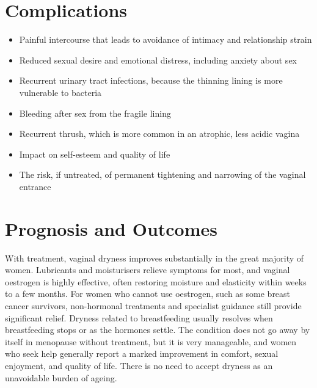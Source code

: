\section*{Complications}
\begin{itemize}
    \item Painful intercourse that leads to avoidance of intimacy and relationship strain
    \item Reduced sexual desire and emotional distress, including anxiety about sex
    \item Recurrent urinary tract infections, because the thinning lining is more vulnerable to bacteria
    \item Bleeding after sex from the fragile lining
    \item Recurrent thrush, which is more common in an atrophic, less acidic vagina
    \item Impact on self-esteem and quality of life
    \item The risk, if untreated, of permanent tightening and narrowing of the vaginal entrance
\end{itemize}

\section*{Prognosis and Outcomes}
With treatment, vaginal dryness improves substantially in the great majority of women. Lubricants and moisturisers relieve symptoms for most, and vaginal oestrogen is highly effective, often restoring moisture and elasticity within weeks to a few months. For women who cannot use oestrogen, such as some breast cancer survivors, non-hormonal treatments and specialist guidance still provide significant relief. Dryness related to breastfeeding usually resolves when breastfeeding stops or as the hormones settle. The condition does not go away by itself in menopause without treatment, but it is very manageable, and women who seek help generally report a marked improvement in comfort, sexual enjoyment, and quality of life. There is no need to accept dryness as an unavoidable burden of ageing.

